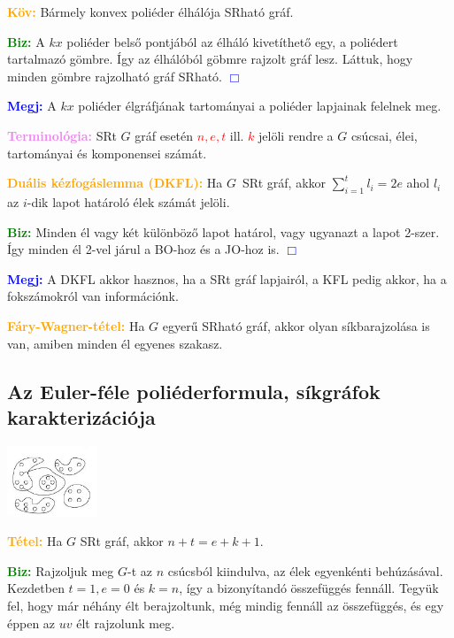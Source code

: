 \documentclass[../szamtud.tex]{subfiles}
\begin{document}
        \textcolor{orange}{\textbf{Köv:}} Bármely konvex poliéder élhálója SRható gráf.

        \textcolor{green}{\textbf{Biz:}} A $kx$ poliéder belső pontjából az élháló kivetíthető egy, a poliédert tartalmazó gömbre. Így az élhálóból göbmre rajzolt gráf lesz. Láttuk, hogy minden gömbre rajzolható gráf SRható. \textcolor{blue}{$\Box$}

        \textcolor{blue}{\textbf{Megj:}} A $kx$ poliéder élgráfjának tartományai a poliéder lapjainak felelnek meg.

        \textcolor{violet}{\textbf{Terminológia:}} SRt $G$ gráf esetén \textcolor{red}{$n, e, t$} ill. \textcolor{red}{$k$} jelöli rendre a $G$ csúcsai, élei, tartományai és komponensei számát.

        \textcolor{orange}{\textbf{Duális kézfogáslemma (DKFL):}} Ha $G$ SRt gráf, akkor $\sum_{i=1}^{t} l_i=2e$ ahol $l_i$ az $i$-dik lapot határoló élek számát jelöli.

        \textcolor{green}{\textbf{Biz:}} Minden él vagy két különböző lapot határol, vagy ugyanazt a lapot 2-szer. Így minden él 2-vel járul a BO-hoz és a JO-hoz is. \textcolor{blue}{$\Box$}

        \textcolor{blue}{\textbf{Megj:}} A DKFL akkor hasznos, ha a SRt gráf lapjairól, a KFL pedig akkor, ha a fokszámokról van információnk.

        \textcolor{orange}{\textbf{Fáry-Wagner-tétel:}} Ha $G$ egyerű SRható gráf, akkor olyan síkbarajzolása is van, amiben minden él egyenes szakasz.

    \subsection{Az Euler-féle poliéderformula, síkgráfok karakterizációja}

        \includegraphics[width=0.2\textwidth]{./img/1.png}

        \textcolor{orange}{\textbf{Tétel:}} Ha $G$ SRt gráf, akkor $n+t=e+k+1$. 

        \textcolor{green}{\textbf{Biz:}} Rajzoljuk meg $G$-t az $n$ csúcsból kiindulva, az élek egyenkénti behúzásával. Kezdetben $t=1, e=0$ és $k=n$, így a bizonyítandó összefüggés fennáll. Tegyük fel, hogy már néhány élt berajzoltunk, még mindig fennáll az összefüggés, és egy éppen az $uv$ élt rajzolunk meg.
\end{document}
